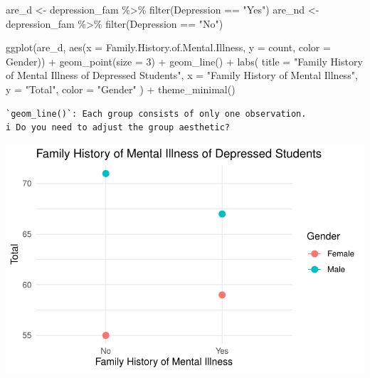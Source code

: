 \documentclass[
  letterpaper,
  DIV=11,
  numbers=noendperiod]{scrartcl}
\newenvironment{Shaded}{\begin{snugshade}}{\end{snugshade}}
\newcommand{\AttributeTok}[1]{\textcolor[rgb]{0.40,0.45,0.13}{#1}}
\newcommand{\DecValTok}[1]{\textcolor[rgb]{0.68,0.00,0.00}{#1}}
\newcommand{\FunctionTok}[1]{\textcolor[rgb]{0.28,0.35,0.67}{#1}}
\newcommand{\NormalTok}[1]{\textcolor[rgb]{0.00,0.23,0.31}{#1}}
\newcommand{\OtherTok}[1]{\textcolor[rgb]{0.00,0.23,0.31}{#1}}
\newcommand{\SpecialCharTok}[1]{\textcolor[rgb]{0.37,0.37,0.37}{#1}}
\newcommand{\StringTok}[1]{\textcolor[rgb]{0.13,0.47,0.30}{#1}}
\begin{document}
\begin{Shaded}
\begin{Highlighting}[]
\NormalTok{are\_d }\OtherTok{\textless{}{-}}\NormalTok{ depression\_fam }\SpecialCharTok{\%\textgreater{}\%} \FunctionTok{filter}\NormalTok{(Depression }\SpecialCharTok{==} \StringTok{"Yes"}\NormalTok{)}
\NormalTok{are\_nd }\OtherTok{\textless{}{-}}\NormalTok{ depression\_fam }\SpecialCharTok{\%\textgreater{}\%} \FunctionTok{filter}\NormalTok{(Depression }\SpecialCharTok{==} \StringTok{"No"}\NormalTok{)}

\FunctionTok{ggplot}\NormalTok{(are\_d, }\FunctionTok{aes}\NormalTok{(}\AttributeTok{x =}\NormalTok{ Family.History.of.Mental.Illness, }\AttributeTok{y =}\NormalTok{ count, }\AttributeTok{color =}\NormalTok{ Gender)) }\SpecialCharTok{+}
  \FunctionTok{geom\_point}\NormalTok{(}\AttributeTok{size =} \DecValTok{3}\NormalTok{) }\SpecialCharTok{+}    
  \FunctionTok{geom\_line}\NormalTok{() }\SpecialCharTok{+}       
  \FunctionTok{labs}\NormalTok{(}
    \AttributeTok{title =} \StringTok{"Family History of Mental Illness of Depressed Students"}\NormalTok{,}
    \AttributeTok{x =} \StringTok{"Family History of Mental Illness"}\NormalTok{,}
    \AttributeTok{y =} \StringTok{"Total"}\NormalTok{,}
    \AttributeTok{color =} \StringTok{"Gender"}
\NormalTok{  ) }\SpecialCharTok{+}
  \FunctionTok{theme\_minimal}\NormalTok{() }
\end{Highlighting}
\end{Shaded}

\begin{verbatim}
`geom_line()`: Each group consists of only one observation.
i Do you need to adjust the group aesthetic?
\end{verbatim}

\includegraphics{Data_files/figure-pdf/unnamed-chunk-11-1.pdf}
\end{document}
